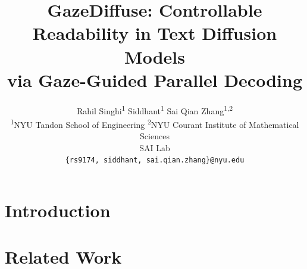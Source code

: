 \documentclass[11pt]{article}
\title{GazeDiffuse: Controllable Readability in Text Diffusion Models\\via Gaze-Guided Parallel Decoding}
\author{
  Rahil Singhi\textsuperscript{1} \quad
  Siddhant\textsuperscript{1} \quad
  Sai Qian Zhang\textsuperscript{1,2} \\
  \textsuperscript{1}NYU Tandon School of Engineering \quad
  \textsuperscript{2}NYU Courant Institute of Mathematical Sciences \\
  SAI Lab \\
  \texttt{\{rs9174, siddhant, sai.qian.zhang\}@nyu.edu}
}
\begin{document}
\maketitle

\begin{abstract}
\end{abstract}

\section{Introduction}
\label{sec:intro}


\section{Related Work}
\label{sec:related}
\end{document}
